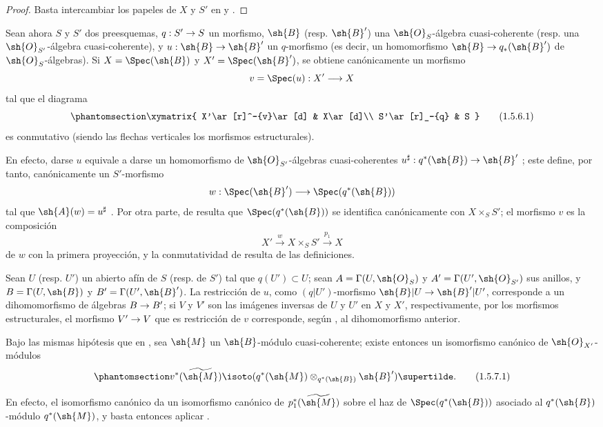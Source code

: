 \documentclass[oneside,10pt]{amsart}
\makeatletter
\newcommand{\ega@arrow}[2]{\mathchoice{#1}{#2}{#2}{#2}}
\renewcommand{\to}{\ega@arrow{\longrightarrow}{\rightarrow}}
\newcommand{\oldpage}[2][]{\marginnote{\normalfont\footnotesize\textbf{#1}~|~#2}\ignorespaces}
\let\EGAOriginalLabel\label
\renewcommand{\label}[1]{\phantomsection\EGAOriginalLabel{#1}}
\makeatother
\begin{document}
\begin{proof}
Basta intercambiar los papeles de $X$ y $S'$ en  y .
\end{proof}

\begin{env}[1.5.6]
\label{II.1.5.6}
Sean ahora $S$ y $S'$ dos preesquemas, $q:S'\to S$ un morfismo, $\sh{B}$ (resp. $\sh{B}'$) una $\sh{O}_S$-álgebra cuasi-coherente (resp. una $\sh{O}_{S'}$-álgebra cuasi-coherente), y $u:\sh{B}\to\sh{B}'$ un $q$-morfismo (es decir, un homomorfismo $\sh{B}\to q_*(\sh{B}')$ de $\sh{O}_S$-álgebras).
Si $X=\Spec(\sh{B})$ y $X'=\Spec(\sh{B}')$, se obtiene canónicamente un morfismo
\[
  v=\Spec(u):X'\to X
\]
tal que el diagrama
\[
\label{II.1.5.6.1}
  \xymatrix{
    X'\ar[r]^-{v}\ar[d] & X\ar[d]\\
    S'\ar[r]_-{q} & S
  }
  \tag{1.5.6.1}
\]
es conmutativo (siendo las flechas verticales los morfismos estructurales).

En efecto, darse $u$ equivale a darse un homomorfismo de $\sh{O}_{S'}$-álgebras cuasi-coherentes $u^\sharp:q^*(\sh{B})\to\sh{B}'$ ; este define, por tanto, canónicamente un $S'$-morfismo
\[
  w:\Spec(\sh{B}')\to\Spec(q^*(\sh{B}))
\]
tal que $\sh{A}(w)=u^\sharp$ .
Por otra parte, de  resulta que $\Spec(q^*(\sh{B}))$ se identifica canónicamente con $X\times_S S'$; el morfismo $v$ es la composición
\[
  X'\xrightarrow{w}X\times_S S'\xrightarrow{p_1}X
\]
de $w$ con la primera proyección, y la conmutatividad de  resulta de las definiciones.

Sean $U$ (resp. $U'$) un abierto afín de $S$ (resp. de $S'$) tal que $q(U')\subset U$; sean $A=\Gamma(U,\sh{O}_S)$ y $A'=\Gamma(U',\sh{O}_{S'})$ sus anillos, y $B=\Gamma(U,\sh{B})$ y $B'=\Gamma(U',\sh{B}')$.
La restricción de $u$, como $(q|U')$-morfismo $\sh{B}|U\to\sh{B}'|U'$, corresponde a un dihomomorfismo de álgebras $B\to B'$; si $V$ y $V'$ son las imágenes inversas de $U$ y $U'$ en $X$ y $X'$, respectivamente, por los morfismos estructurales, el morfismo $V'\to V$ que es restricción de $v$ corresponde, según , al dihomomorfismo anterior.
\end{env}

\begin{env}[1.5.7]
\label{II.1.5.7}
Bajo las mismas hipótesis que en , sea $\sh{M}$ un $\sh{B}$-módulo cuasi-coherente; existe entonces un isomorfismo canónico de $\sh{O}_{X'}$-módulos
\[
\label{II.1.5.7.1}
  v^*(\widetilde{\sh{M}})
  \isoto
  (q^*(\sh{M})\otimes_{q^*(\sh{B})}\sh{B}')\supertilde.
  \tag{1.5.7.1}
\]

\oldpage[II]{14}
En efecto, el isomorfismo canónico  da un isomorfismo canónico de $p_1^*(\widetilde{\sh{M}})$ sobre el haz de $\Spec(q^*(\sh{B}))$ asociado al $q^*(\sh{B})$-módulo $q^*(\sh{M})$, y basta entonces aplicar .
\end{env}
\end{document}
